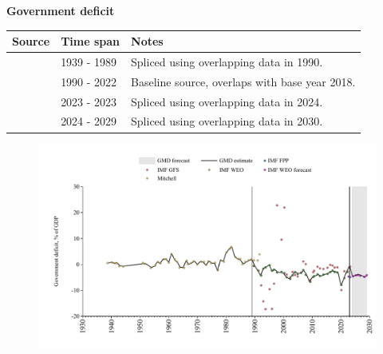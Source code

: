 \documentclass[12pt,a4paper,landscape]{article}
\begin{document}
\begin{adjustbox}{max totalsize={\paperwidth}{\paperheight},center}
\begin{minipage}[t][\textheight][t]{\textwidth}
\vspace*{0.5cm}
{}
\begin{center}
{\Large\bfseries Government deficit}
\end{center}
\vspace{0.5cm}
\begin{table}[H]
\centering
\small
\begin{tabular}{|l|l|l|}
\hline
\textbf{Source} & \textbf{Time span} & \textbf{Notes} \\
\hline
\rowcolor{white}\cite{Mitchell}& 1939 - 1989 &Spliced using overlapping data in 1990. \\
\rowcolor{lightgray}\cite{IMF_WEO}& 1990 - 2022 &Baseline source, overlaps with base year 2018. \\
\rowcolor{white}\cite{IMF_GFS}& 2023 - 2023 &Spliced using overlapping data in 2024. \\
\rowcolor{lightgray}\cite{IMF_WEO_forecast}& 2024 - 2029 &Spliced using overlapping data in 2030. \\
\hline
\end{tabular}
\end{table}
\begin{figure}[H]
\centering
\includegraphics[width=\textwidth,height=0.6\textheight,keepaspectratio]{graphs/SLV_govdef_GDP.pdf}
\end{figure}
\end{minipage}
\end{adjustbox}
\end{document}
